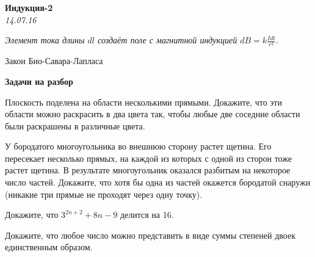 \begin{center}
\textbf{\Large Индукция-2}\\
\textit{14.07.16}
\end{center}

\epigraph{\it Элемент тока длины $dl$ создаёт поле с магнитной индукцией $dB = k\frac{Idl}{r^2}$.}{Закон Био-Савара-Лапласа}

{\bf Задачи на разбор}
\begin{problems}

\item Плоскость поделена на области несколькими прямыми. Докажите, что эти области можно раскрасить в два цвета так, чтобы любые две соседние области были раскрашены в различные цвета.
\item У бородатого многоугольника во внешнюю сторону растет щетина. Его пересекает несколько прямых, на каждой из которых с одной из сторон тоже растет щетина. В результате многоугольник оказался разбитым на некоторое число частей. Докажите, что хотя бы одна из частей окажется бородатой снаружи (никакие три прямые не проходят через одну точку).
\item Докажите, что $3^{2n+2}+8n-9$ делится на 16.
\item Докажите, что любое число можно представить в виде суммы степеней двоек единственным образом.

\end{problems}
\resetproblem


